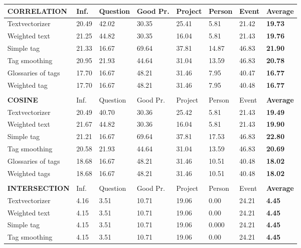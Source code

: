 \begin{table}

\begin{tabular}{| l | l | l | l | l | l | l | l |}
\hline
{\bf CORRELATION} & Inf. &  Question &  Good Pr.& Project & Person &  Event & {\bf Average} \\
\hline
Textvectorizer & 20.49 & 42.02 & 30.35 & 25.41 & 5.81 & 21.42 & {\bf 19.73} \\ 
Weighted text & 21.25 & 44.82 & 30.35 & 16.04 & 5.81 & 21.43 & {\bf 19.76} \\ 
Simple tag & 21.33 & 16.67 & 69.64 & 37.81 & 14.87 & 46.83 & {\bf 21.90} \\ 
Tag smoothing & 20.95 & 21.93 & 44.64 & 31.04 & 13.59 & 46.83 & {\bf 20.78} \\ 
Glossaries of tags & 17.70 & 16.67 & 48.21 & 31.46 & 7.95 & 40.47 & {\bf 16.77} \\ 
Weighted tag & 17.70 & 16.67 & 48.21 & 31.46 & 7.95 & 40.48 & {\bf 16.77} \\ 
\hline
\\
\hline
{\bf COSINE} & Inf. &  Question &  Good Pr.& Project & Person &  Event & {\bf Average} \\
\hline
Textvectorizer & 20.49 & 40.70 & 30.36 & 25.42 & 5.81 & 21.43 & {\bf 19.49} \\ 
Weighted text & 21.67 & 44.82 & 30.36 & 16.04 & 5.81 & 21.43 & {\bf 19.90} \\ 
Simple tag & 21.21 & 16.67 & 69.64 & 37.81 & 17.53 & 46.83 & {\bf 22.80 } \\ 
Tag smoothing & 20.58 & 21.93 & 44.64 & 31.04 & 13.59 & 46.83 & {\bf 20.69} \\ 
Glossaries of tags & 18.68 & 16.67 & 48.21 & 31.46 & 10.51 & 40.48 & {\bf 18.02} \\ 
Weighted tags & 18.68 & 16.67 & 48.21 & 31.46 & 10.51 & 40.48 & {\bf 18.02} \\ 
\hline
\\
\hline
{\bf INTERSECTION} & Inf. &  Question &  Good Pr.& Project & Person &  Event & {\bf Average} \\
\hline
Textvectorizer & 4.16 & 3.51 & 10.71 & 19.06 & 0.00 & 24.21 & {\bf 4.45} \\ 
Weighted text & 4.15 & 3.51 & 10.71 & 19.06 & 0.00 & 24.21 & {\bf 4.45} \\ 
Simple tag & 4.15 & 3.51 & 10.71 & 19.06 & 0.000 & 24.21 & {\bf 4.45} \\ 
Tag smoothing & 4.15 & 3.51 & 10.71 & 19.06 & 0.00 & 24.21 & {\bf 4.45} \\ 

\end{tabular}
\end{table}
